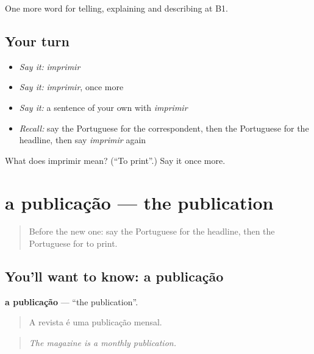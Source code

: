 \begin{grammarlens}[title={What you've built}]
One more word for telling, explaining and describing at B1.
\end{grammarlens}

\subsection*{Your turn}
\begin{itemize}
\raggedright
  \item \emph{Say it:} \emph{imprimir}
  \item \emph{Say it:} \emph{imprimir}, once more
  \item \emph{Say it:} a sentence of your own with \emph{imprimir}
  \item \emph{Recall:} say the Portuguese for the correspondent, then the Portuguese for the headline, then say \emph{imprimir} again
\end{itemize}

\begin{tcolorbox}[breakable,colback=teal!4,colframe=teal!35!black,title={Before you move on}]
What does imprimir mean? (\textquotedblleft{}To print\textquotedblright{}.) Say it once more.
\end{tcolorbox}
\section[a publicação]{a publicação — the publication}

\label{lesson:PT-C280-publicacao}



\begin{quote}
Before the new one: say the Portuguese for the headline, then the Portuguese for to print.
\end{quote}

\subsection*{You'll want to know: a publicação}
\textbf{a publicação} — \textquotedblleft{}the publication\textquotedblright{}.

\begin{quote}
A revista é uma publicação mensal.
\end{quote}

\begin{quote}
\emph{The magazine is a monthly publication.}
\end{quote}

